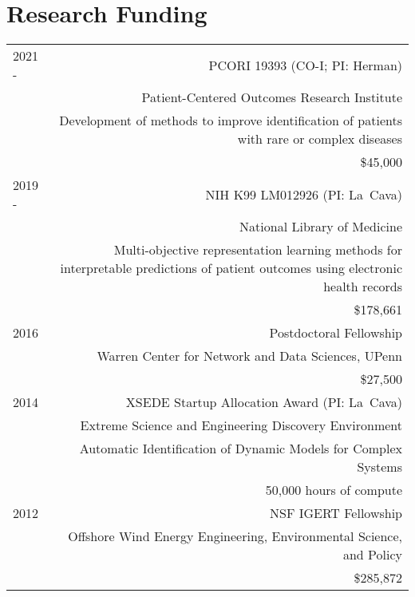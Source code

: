 \section*{Research Funding}
\begin{tabular}{L!{\VRule}R}
2021 -  & PCORI 19393 (CO-I; PI: Herman) \\
        & Patient-Centered Outcomes Research Institute\\
        & Development of methods to improve identification of patients with rare or complex diseases\\
        &\$45,000 \\
2019 -  & NIH K99 LM012926 (PI: La~Cava) \\
        & National Library of Medicine\\
        & Multi-objective representation learning methods for interpretable predictions of patient outcomes using electronic health records \\
        & \$178,661 \\
2016    & Postdoctoral Fellowship\\
        & Warren Center for Network and Data Sciences, UPenn \\
        & \$27,500\\
2014    & XSEDE Startup Allocation Award (PI: La~Cava)\\
        & Extreme Science and Engineering Discovery Environment\\
        & Automatic Identification of Dynamic Models for Complex Systems  \\
        & 50,000 hours of compute \\
2012    & NSF IGERT Fellowship\\
        & Offshore Wind Energy Engineering, Environmental Science, and Policy \\
        & \$285,872 \\
\end{tabular}
